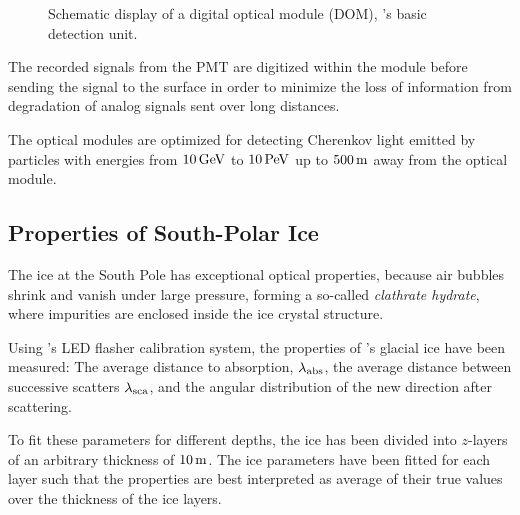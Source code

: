 \begin{figure}[htbp]
  \hfill
  \caption{Schematic display of a digital optical module (DOM), \icecube's basic detection unit.}
  \label{fig:aK4raigh}
\end{figure}

The recorded signals from the PMT are digitized within the module before
sending the signal to the surface in order to minimize the loss of
information from degradation of analog signals sent over long distances.
\cite{firstyearperformance}

The optical modules are optimized for detecting Cherenkov light emitted
by particles with energies from \(10\text{\,GeV}\) to \(10\text{\,PeV}\) up to \(500\text{\,m}\)
away from the optical module. \cite{instrumentation}

\subsection{Properties of South-Polar Ice}
\label{sec:ice}

The ice at the South Pole has exceptional optical properties, because
air bubbles shrink and vanish under large pressure, forming a so-called
\textit{clathrate hydrate}, where impurities are enclosed inside the ice
crystal structure. \cite{rongenswedishcamera}

Using \icecube's LED flasher calibration system, the properties of
\icecube's glacial ice have been measured: The average distance to
absorption, \(\lambda_\text{abs}\), the average distance between successive
scatters \(\lambda_\text{sca}\), and the angular distribution of the new
direction after scattering.

To fit these parameters for different depths, the ice has been divided
into \(z\)-layers of an arbitrary thickness of \(10\text{\,m}\). The ice
parameters have been fitted for each layer such that the properties are
best interpreted as average of their true values over the thickness of
the ice layers. \cite{icepaper}

